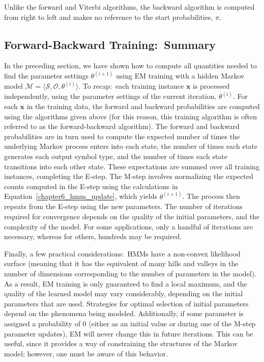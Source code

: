 \noindent Unlike the forward and Viterbi algorithms, the backward
algorithm is computed from right to left and makes no reference to the
start probabilities, $\pi$.

\subsection{Forward-Backward Training:\ Summary} 

In the preceding section, we have shown how to compute all quantities
needed to find the parameter settings $\theta^{(i+1)}$ using EM
training with a hidden Markov model $\mathcal{M}=\langle
\mathcal{S},\mathcal{O}, \theta^{(i)} \rangle$.  To recap:\ each
training instance $\textbf{x}$ is processed independently, using the
parameter settings of the current iteration, $\theta^{(i)}$. For each
$\textbf{x}$ in the training data, the forward and backward
probabilities are computed using the algorithms given above (for this
reason, this training algorithm is often referred to as the
forward-backward algorithm).  The forward and backward probabilities
are in turn used to compute the expected number of times the
underlying Markov process enters into each state, the number of times
each state generates each output symbol type, and the number of times
each state transitions into each other state.  These expectations are
summed over all training instances, completing the E-step.  The M-step
involves normalizing the expected counts computed in the E-step using
the calculations in Equation~\ref{chapter6_hmm_update}, which yields
$\theta^{(i+1)}$.  The process then repeats from the E-step using the
new parameters.  The number of iterations required for convergence
depends on the quality of the initial parameters, and the complexity
of the model.  For some applications, only a handful of iterations are
necessary, whereas for others, hundreds may be required.

Finally, a few practical considerations:\ HMMs have a non-convex
likelihood surface (meaning that it has the equivalent of many hills
and valleys in the number of dimensions corresponding to the number of
parameters in the model).  As a result, EM training is only guaranteed
to find a local maximum, and the quality of the learned model may vary
considerably, depending on the initial parameters that are used.
Strategies for optimal selection of initial parameters depend on the
phenomena being modeled.  Additionally, if some parameter is assigned
a probability of 0 (either as an initial value or during one of the
M-step parameter updates), EM will never change this in future
iterations.  This can be useful, since it provides a way of
constraining the structures of the Markov model; however, one must be
aware of this behavior.


